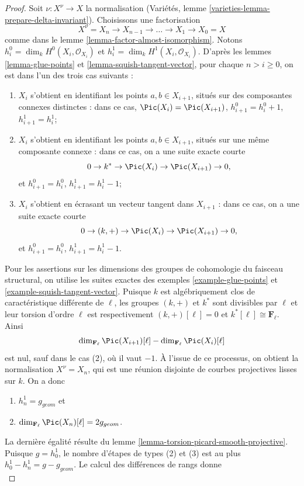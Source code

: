 \begin{proof}
Soit $\nu : X^\nu \to X$ la normalisation (Variétés, lemme \ref{varieties-lemma-prepare-delta-invariant}). Choisissons une factorisation $$
X^\nu = X_n \to X_{n - 1} \to \ldots \to X_1 \to X_0 = X
$$ comme dans le lemme \ref{lemma-factor-almost-isomorphism}. Notons $h^0_i = \dim_k H^0(X_i, \mathcal{O}_{X_i})$ et $h^1_i = \dim_k H^1(X_i, \mathcal{O}_{X_i})$. D'après les lemmes \ref{lemma-glue-points} et \ref{lemma-squish-tangent-vector}, pour chaque $n > i \geq 0$, on est dans l'un des trois cas suivants : \begin{enumerate} \item $X_i$ s'obtient en identifiant les points $a, b \in X_{i + 1}$, situés sur des composantes connexes distinctes : dans ce cas, $\Pic(X_i) = \Pic(X_{i + 1})$, $h^0_{i + 1} = h^0_i + 1$, $h^1_{i + 1} = h^1_i$; \item $X_i$ s'obtient en identifiant les points $a, b \in X_{i + 1}$, situés sur une même composante connexe : dans ce cas, on a une suite exacte courte $$
0 \to k^* \to \Pic(X_i) \to \Pic(X_{i + 1}) \to 0,
$$ et $h^0_{i + 1} = h^0_i$, $h^1_{i + 1} = h^1_i - 1$; \item $X_i$ s'obtient en écrasant un vecteur tangent dans $X_{i + 1}$ : dans ce cas, on a une suite exacte courte $$
0 \to (k, +) \to \Pic(X_i) \to \Pic(X_{i + 1}) \to 0,
$$ et $h^0_{i + 1} = h^0_i$, $h^1_{i + 1} = h^1_i - 1$. \end{enumerate} Pour les assertions sur les dimensions des groupes de cohomologie du faisceau structural, on utilise les suites exactes des exemples \ref{example-glue-points} et \ref{example-squish-tangent-vector}. Puisque $k$ est algébriquement clos de caractéristique différente de $\ell$, les groupes $(k, +)$ et $k^*$ sont divisibles par $\ell$ et leur torsion d'ordre $\ell$ est respectivement $(k, +)[\ell] = 0$ et $k^*[\ell] \cong \mathbf{F}_\ell$. Ainsi $$
\dim_{\mathbf{F}_\ell} \Pic(X_{i + 1})[\ell] -
\dim_{\mathbf{F}_\ell}\Pic(X_i)[\ell]
$$ est nul, sauf dans le cas (2), où il vaut $-1$. À l'issue de ce processus, on obtient la normalisation $X^\nu = X_n$, qui est une réunion disjointe de courbes projectives lisses sur $k$. On a donc \begin{enumerate} \item $h^1_n = g_{geom}$ et \item $\dim_{\mathbf{F}_\ell} \Pic(X_n)[\ell] = 2g_{geom}$. \end{enumerate} La dernière égalité résulte du lemme \ref{lemma-torsion-picard-smooth-projective}. Puisque $g = h^1_0$, le nombre d'étapes de types (2) et (3) est au plus $h^1_0 - h^1_n = g - g_{geom}$. Le calcul des différences de rangs donne $$
$$
\end{proof}
